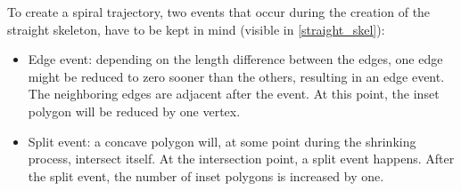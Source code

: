 To create a spiral trajectory, two events that occur during the creation of the straight skeleton, have to be kept in mind (visible in \autoref{straight_skel}): 

\begin{itemize}
\item Edge event: depending on the length difference between the edges, one edge might be reduced to zero sooner than the others, resulting in an edge event. The neighboring edges are adjacent after the event. At this point, the inset polygon will be reduced by one vertex.
\item Split event: a concave polygon will, at some point during the shrinking process, intersect itself. At the intersection point, a split event happens. After the split event, the number of inset polygons is increased by one.
\end{itemize}

